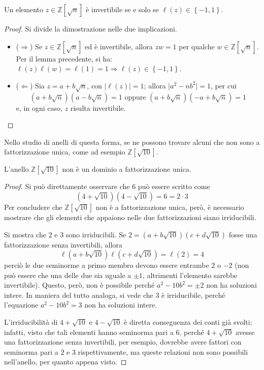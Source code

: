 \documentclass[11pt, a4paper]{scrartcl}
\theoremstyle{definition}
\numberwithin{esempio}{section}
\theoremstyle{definition}
\numberwithin{obs}{section}
\numberwithin{nota}{section}
\numberwithin{equation}{subsection}
\begin{document}
\begin{lemma}
	{}{}
	Un elemento $z \in \mathbb{Z}[\sqrt{n} ]$ \`e invertibile se e solo se $\ell (z) \in  \left\{ -1,1 \right\} $.
	\begin{proof}
		Si divide la dimostrazione nelle due implicazioni.
		\begin{itemize}
			\item ($\Rightarrow $) Se $z \in \mathbb{Z}[\sqrt{n} ]$ ed \`e invertibile, allora $zw = 1$ per qualche $w \in \mathbb{Z}[\sqrt{n} ]$. 
				Per il lemma precedente, si ha: $\ell (z) \ell (w) = \ell (1) = 1 \Rightarrow \ell (z) \in \left\{ -1,1 \right\} $.
			\item ($\Leftarrow$) Sia $z = a + b \sqrt{n} $, con $\lvert \ell (z) \rvert = 1$; allora $\lvert a^2 - nb^2 \rvert = 1$, per cui
				\[
				\left(a + b \sqrt{n} \right) \left(a - b \sqrt{n} \right) =1 \text{ oppure } \left(a + b\sqrt{n} \right) \left(-a + b\sqrt{n} \right) =1
				\] 
				e, in ogni caso, $z$ risulta invertibile.
		\end{itemize}
	\end{proof}
\end{lemma}
\noindent Nello studio di anelli di questa forma, se ne possono trovare alcuni che non sono a fattorizzazione unica, come ad esempio $\mathbb{Z}[\sqrt{10} ]$.
\begin{prop}
	{}{}
	L'anello $\mathbb{Z}[\sqrt{10} ]$ non \`e un dominio a fattorizzazione unica.
	\begin{proof}
		Si pu\`o direttamente osservare che $6$ pu\`o essere scritto come
		\[
		\left(4 + \sqrt{10} \right) \left(4 - \sqrt{10} \right) = 6 = 2\cdot 3
		\] 
		Per concludere che $\mathbb{Z}[\sqrt{10} ]$ non \`e a fattorizzazione unica, per\`o, \`e necessario mostrare che gli elementi che appaiono nelle due fattorizzazioni siano irriducibili.

		Si mostra che $2$ e $3$ sono irriducibili.
		Se $2 = \left(a + b \sqrt{10} \right) \left(c + d\sqrt{10} \right) $ fosse una fattorizzazione senza invertibili, allora
		\[
		\ell \left(a + b \sqrt{10} \right) \ell \left(c + d \sqrt{10} \right) = \ell (2) = 4
		\] 
		perci\`o le due seminorme a primo membro devono essere entrambe $2$ o $-2$ (non pu\`o essere che una delle due sia uguale a $\pm 1$, altrimenti l'elemento sarebbe invertibile).
		Questo, per\`o, non \`e possibile perch\'e $a^2 - 10 b^2 = \pm 2$ non ha soluzioni intere.
		In maniera del tutto analoga, si vede che $3$ \`e irriducibile, perch\'e l'equazione $a^2 - 10 b^2 = 3$ non ha soluzioni intere.

		L'irriducibilit\`a di $4 + \sqrt{10} $ e $4 - \sqrt{10} $ \`e diretta conseguenza dei conti gi\`a svolti; infatti, visto che tali elementi hanno seminorma pari a $6$, perch\'e $4 + \sqrt{10} $ avesse una fattorizzazione senza invertibili, per esempio, dovrebbe avere fattori con seminorma pari a $2$ e $3$ rispettivamente, ma queste relazioni non sono possibili nell'anello, per quanto appena visto.
	\end{proof}
\end{prop}
\end{document}

